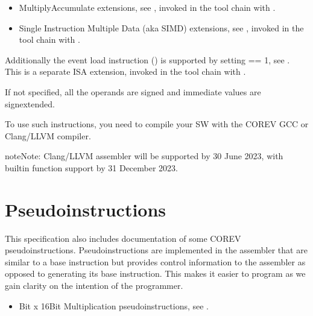 \documentclass[letterpaper,10pt,english]{sphinxmanual}
\begin{document}
\begin{itemize}
\item {} 
\sphinxAtStartPar
Multiply\sphinxhyphen{}Accumulate extensions, see {\hyperref[\detokenize{instruction_set_extensions:corev-multiply-accumulate}]{}}, invoked in the tool chain with .

\item {} 
\sphinxAtStartPar
Single Instruction Multiple Data (aka SIMD) extensions, see {\hyperref[\detokenize{instruction_set_extensions:corev-simd}]{}}, invoked in the tool chain with .

\end{itemize}

\sphinxAtStartPar
Additionally the event load instruction () is supported by setting  == 1, see {\hyperref[\detokenize{instruction_set_extensions:corev-event-load}]{}}.
This is a separate ISA extension, invoked in the tool chain with .

\sphinxAtStartPar
If not specified, all the operands are signed and immediate values are sign\sphinxhyphen{}extended.

\sphinxAtStartPar
To use such instructions, you need to compile your SW with the CORE\sphinxhyphen{}V GCC or Clang/LLVM compiler.

\begin{sphinxadmonition}{note}{Note:}
\sphinxAtStartPar
Clang/LLVM assembler will be supported by 30 June 2023, with builtin function support by 31 December 2023.
\end{sphinxadmonition}


\section{Pseudo\sphinxhyphen{}instructions}
\label{\detokenize{instruction_set_extensions:pseudo-instructions}}\label{\detokenize{instruction_set_extensions:id1}}
\sphinxAtStartPar
This specification also includes documentation of some CORE\sphinxhyphen{}V pseudo\sphinxhyphen{}instructions. Pseudo\sphinxhyphen{}instructions are implemented in the assembler
that are similar to a base instruction but provides control information to the assembler as opposed to generating its base instruction.
This makes it easier to program as we gain clarity on the intention of the programmer.
\begin{itemize}
\item {} 
\sphinxhyphen{}Bit x 16\sphinxhyphen{}Bit Multiplication pseudo\sphinxhyphen{}instructions, see {\hyperref[\detokenize{instruction_set_extensions:corev-16-bit-multiply-pseudo-instructions}]{}}.

\end{itemize}
\end{document}
